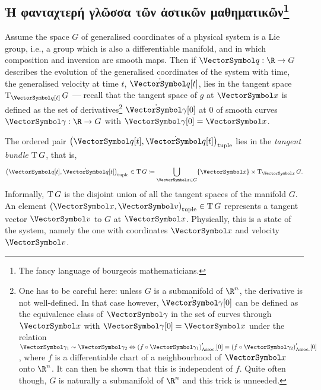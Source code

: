 \documentclass[10pt, a4paper, twoside]{lecturenotes}
\newcommand{\Rn}{{\R^n}}
\begin{document}
\begin{supplemental}
\subsection{\textgreek{Ἡ φανταχτερή γλῶσσα τῶν ἀστικῶν μαθηματικῶν}\footnote{The fancy language of bourgeois mathematicians.}}
\begingroup
\newcommand{\VelocitySpace}{\LieAlgebraSymbol{g}}
\newcommand{\MomentumSpace}{\Dual\VelocitySpace}
\newcommand{\Lagrangian}{\mathscr{L}}
\newcommand{\Hamiltonian}{\mathscr{H}}
\newcommand{\eqrel}{\sim}
Assume the space $G$ of generalised coordinates of a physical system is a Lie group, i.e., a group which is also a differentiable manifold, and in which composition and inversion are smooth maps. Then if $\FunctionSpec\vq \R G$ describes the evolution of the generalised coordinates of the system with time, the generalised velocity at time $t$, $\TimeDerivative\vq\of t$, lies in the tangent space $\TangentSpace{\vq\of t}G$ --- recall that the tangent space of $g$ at $\vx$ is defined as the set of derivatives\footnote{One has to be careful here: unless $G$ is a submanifold of $\Rn$, the derivative is not well-defined. In that case however, $\TimeDerivative \vgg\of 0$ can be defined as the equivalence class of $\vgg$ in the set of curves through $\vx$ with $\vgg\of 0 = \vx$ under the relation $\vgg_1\eqrel\vgg_2 \Equivalent \pa{f\Compose\vgg_1}\der\of 0 = \pa{f\Compose\vgg_2}\der\of 0$, where $f$ is a differentiable chart of a neighbourhood of $\vx$ onto $\Rn$. It can then be shown that this is independent of $f$. Quite often though, $G$ is naturally a submanifold of $\Rn$ and this trick is unneeded.} $\TimeDerivative \vgg\of 0$ at $0$ of smooth curves $\FunctionSpec\vgg\R G$ with $\vgg\of 0 = \vx$.

The ordered pair $\tuple{\vq\of t,\TimeDerivative\vq\of t}$ lies in the \emph{tangent bundle} $\operatorname{T}{G}$, that is,
\begin{equation*}
\tuple{\vq\of t,\TimeDerivative\vq\of t} \in \TangentBundle G \DefineAs \UnionOver{\vx \in G} \set{\vx} \Cartesian \TangentSpace{\vx}G\text{.}
\end{equation*}
Informally, $\operatorname{T}{G}$ is the disjoint union of all the tangent spaces of the manifold $G$. An element $\tuple{\vx,\vv}\in \TangentBundle G$  represents a tangent vector $\vv$ to $G$ at $\vx$. Physically, this is a state of the system, namely the one with coordinates $\vx$ and velocity $\vv$. 


\end{supplemental}
\end{document}
